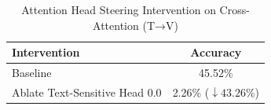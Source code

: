 \begin{table}[h]
\centering
\caption{Attention Head Steering Intervention on Cross-Attention (T→V)}
\label{tab:attention_steering}
\begin{tabular}{lc}
\toprule
\textbf{Intervention} & \textbf{Accuracy} \\
\midrule
Baseline & 45.52\% \\
Ablate Text-Sensitive Head 0.0 & 2.26\% ($\downarrow 43.26$\%) \\
\bottomrule
\end{tabular}
\end{table}

